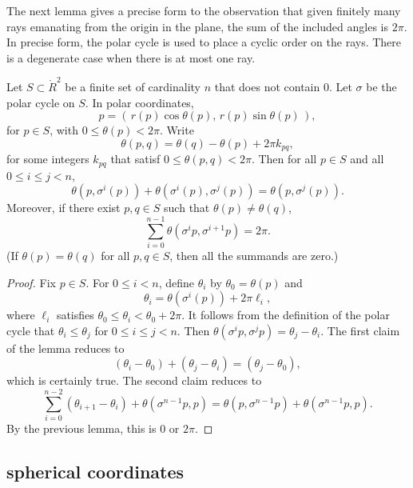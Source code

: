 The next lemma gives a precise form to the observation
that given finitely many rays emanating from the origin
in the plane, the sum of the included angles is $2\pi$.
In precise form, the polar cycle is used to place
a cyclic order on the rays.  There is a degenerate case
when there is at most one ray.


\begin{lemma}\label{lemma:polar-sum}
Let $S\subset\ring{R}^2$ be a finite set
of cardinality $n$ that does not contain $0$.
Let $\sigma$ be the polar cycle on $S$.  
In polar coordinates,
$$p=\left(\, r(p)\cos\theta(p),\, r(p)\sin\theta(p)\,\right),$$ 
for $p\in S$, with
$0\le\theta(p)<2\pi$.
Write
   $$
   \theta(p,q) = \theta(q) - \theta(p) + 2\pi k_{pq},
   $$
for some integers $k_{pq}$ that satisf $0\le \theta(p,q) < 2\pi$.
Then for all $p\in S$
and all $0\le i \le j < n$,
   $$
   \theta(p,\sigma^i(p)) +\theta(\sigma^i(p),\sigma^j(p)) =
   \theta(p,\sigma^j(p)).
   $$
Moreover, if there exist $p,q\in S$ such that $\theta(p)\ne\theta(q)$,
  $$
  \sum_{i=0}^{n-1} \theta(\sigma^{i}p,\sigma^{i+1} p) = 2\pi.
  $$
(If $\theta(p)=\theta(q)$ for all $p,q\in S$, then all the
summands are zero.)
\end{lemma}

\begin{proof}
Fix $p\in S$.
For $0\le i<n$, define $\theta_i$ by
   $\theta_0=\theta(p)$ and 
   $$\theta_i = \theta(\sigma^i(p)) + 2\pi \ell_i,$$
where  $\ell_i$ satisfies $\theta_0\le \theta_i < \theta_0+2\pi$.
It follows from the definition of the polar cycle that
$\theta_i \le \theta_j$ for $0\le i\le j < n$.  Then
$\theta(\sigma^i p ,\sigma^j p) = \theta_j - \theta_i$.
The first claim of the lemma reduces to
  $$
  (\theta_i-\theta_0) + (\theta_j-\theta_i) = (\theta_j-\theta_0),
  $$
which is certainly true.
The second claim reduces to
  $$
  \sum_{i=0}^{n-2} (\theta_{i+1}-\theta_i) + \theta(\sigma^{n-1}p,p)
  = \theta(p,\sigma^{n-1}p) + \theta(\sigma^{n-1}p,p).
  $$
By the previous lemma, this is $0$ or $2\pi$.
\end{proof}

\subsection{spherical coordinates}
\label{sec:spherical}



